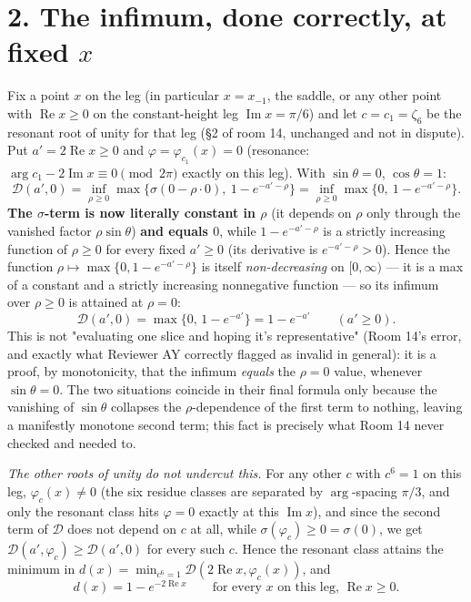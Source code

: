 \documentclass[11pt]{article}
\begin{document}
\section*{2. The infimum, done correctly, at fixed $x$}

Fix a point $x$ on the leg (in particular $x=x_{-1}$, the saddle, or any other point with
$\operatorname{Re}x\ge0$ on the constant-height leg $\operatorname{Im}x=\pi/6$) and let $c=c_1=\zeta_6$
be the resonant root of unity for that leg (\S2 of room 14, unchanged and not in dispute). Put
$a'=2\operatorname{Re}x\ge0$ and $\varphi=\varphi_{c_1}(x)=0$ (resonance: $\arg c_1-2\operatorname{Im}x
\equiv0\pmod{2\pi}$ exactly on this leg). With $\sin\theta=0$, $\cos\theta=1$:
\[
\mathcal D(a',0)=\inf_{\rho\ge0}\max\bigl\{\sigma(0-\rho\cdot0),\ 1-e^{-a'-\rho}\bigr\}
=\inf_{\rho\ge0}\max\bigl\{0,\ 1-e^{-a'-\rho}\bigr\}.
\]
\textbf{The $\sigma$-term is now literally constant in $\rho$} (it depends on $\rho$ only through
the vanished factor $\rho\sin\theta$) \textbf{and equals $0$}, while $1-e^{-a'-\rho}$ is a strictly
increasing function of $\rho\ge0$ for every fixed $a'\ge0$ (its derivative is $e^{-a'-\rho}>0$).
Hence the function $\rho\mapsto\max\{0,1-e^{-a'-\rho}\}$ is itself \emph{non-decreasing} on
$[0,\infty)$ --- it is a max of a constant and a strictly increasing nonnegative function --- so its
infimum over $\rho\ge0$ is attained at $\rho=0$:
\[
\mathcal D(a',0)=\max\{0,\,1-e^{-a'}\}=1-e^{-a'}\qquad(a'\ge0).
\]
This is not "evaluating one slice and hoping it's representative" (Room 14's error, and exactly
what Reviewer AY correctly flagged as invalid in general): it is a proof, by monotonicity, that the
infimum \emph{equals} the $\rho=0$ value, whenever $\sin\theta=0$. The two situations coincide in
their final formula only because the vanishing of $\sin\theta$ collapses the $\rho$-dependence of
the first term to nothing, leaving a manifestly monotone second term; this fact is precisely what
Room 14 never checked and needed to.

\emph{The other roots of unity do not undercut this.} For any other $c$ with $c^6=1$ on this leg,
$\varphi_c(x)\ne0$ (the six residue classes are separated by $\arg$-spacing $\pi/3$, and only the
resonant class hits $\varphi=0$ exactly at this $\operatorname{Im}x$), and since the second term of
$\mathcal D$ does not depend on $c$ at all, while $\sigma(\varphi_c)\ge0=\sigma(0)$, we get
$\mathcal D(a',\varphi_c)\ge\mathcal D(a',0)$ for every such $c$. Hence the resonant class attains
the minimum in $d(x)=\min_{c^6=1}\mathcal D(2\operatorname{Re}x,\varphi_c(x))$, and
\[
d(x)=1-e^{-2\operatorname{Re}x}\qquad\text{for every }x\text{ on this leg, }\operatorname{Re}x\ge0.
\]
\end{document}
